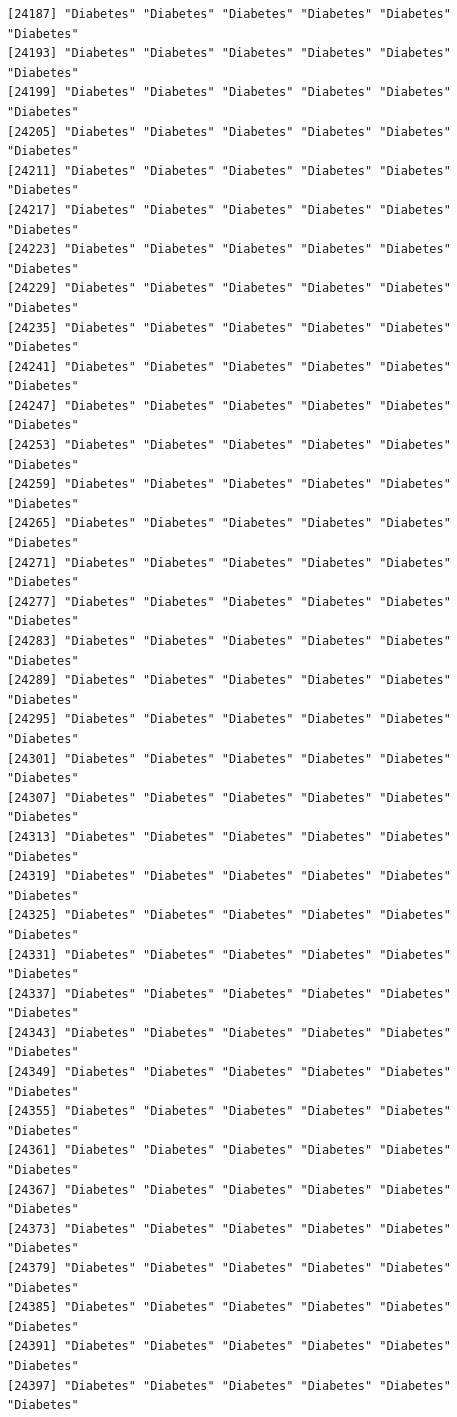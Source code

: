 \documentclass[
  letterpaper,
  DIV=11,
  numbers=noendperiod]{scrartcl}
\begin{document}
\begin{verbatim}
[24187] "Diabetes" "Diabetes" "Diabetes" "Diabetes" "Diabetes" "Diabetes"
[24193] "Diabetes" "Diabetes" "Diabetes" "Diabetes" "Diabetes" "Diabetes"
[24199] "Diabetes" "Diabetes" "Diabetes" "Diabetes" "Diabetes" "Diabetes"
[24205] "Diabetes" "Diabetes" "Diabetes" "Diabetes" "Diabetes" "Diabetes"
[24211] "Diabetes" "Diabetes" "Diabetes" "Diabetes" "Diabetes" "Diabetes"
[24217] "Diabetes" "Diabetes" "Diabetes" "Diabetes" "Diabetes" "Diabetes"
[24223] "Diabetes" "Diabetes" "Diabetes" "Diabetes" "Diabetes" "Diabetes"
[24229] "Diabetes" "Diabetes" "Diabetes" "Diabetes" "Diabetes" "Diabetes"
[24235] "Diabetes" "Diabetes" "Diabetes" "Diabetes" "Diabetes" "Diabetes"
[24241] "Diabetes" "Diabetes" "Diabetes" "Diabetes" "Diabetes" "Diabetes"
[24247] "Diabetes" "Diabetes" "Diabetes" "Diabetes" "Diabetes" "Diabetes"
[24253] "Diabetes" "Diabetes" "Diabetes" "Diabetes" "Diabetes" "Diabetes"
[24259] "Diabetes" "Diabetes" "Diabetes" "Diabetes" "Diabetes" "Diabetes"
[24265] "Diabetes" "Diabetes" "Diabetes" "Diabetes" "Diabetes" "Diabetes"
[24271] "Diabetes" "Diabetes" "Diabetes" "Diabetes" "Diabetes" "Diabetes"
[24277] "Diabetes" "Diabetes" "Diabetes" "Diabetes" "Diabetes" "Diabetes"
[24283] "Diabetes" "Diabetes" "Diabetes" "Diabetes" "Diabetes" "Diabetes"
[24289] "Diabetes" "Diabetes" "Diabetes" "Diabetes" "Diabetes" "Diabetes"
[24295] "Diabetes" "Diabetes" "Diabetes" "Diabetes" "Diabetes" "Diabetes"
[24301] "Diabetes" "Diabetes" "Diabetes" "Diabetes" "Diabetes" "Diabetes"
[24307] "Diabetes" "Diabetes" "Diabetes" "Diabetes" "Diabetes" "Diabetes"
[24313] "Diabetes" "Diabetes" "Diabetes" "Diabetes" "Diabetes" "Diabetes"
[24319] "Diabetes" "Diabetes" "Diabetes" "Diabetes" "Diabetes" "Diabetes"
[24325] "Diabetes" "Diabetes" "Diabetes" "Diabetes" "Diabetes" "Diabetes"
[24331] "Diabetes" "Diabetes" "Diabetes" "Diabetes" "Diabetes" "Diabetes"
[24337] "Diabetes" "Diabetes" "Diabetes" "Diabetes" "Diabetes" "Diabetes"
[24343] "Diabetes" "Diabetes" "Diabetes" "Diabetes" "Diabetes" "Diabetes"
[24349] "Diabetes" "Diabetes" "Diabetes" "Diabetes" "Diabetes" "Diabetes"
[24355] "Diabetes" "Diabetes" "Diabetes" "Diabetes" "Diabetes" "Diabetes"
[24361] "Diabetes" "Diabetes" "Diabetes" "Diabetes" "Diabetes" "Diabetes"
[24367] "Diabetes" "Diabetes" "Diabetes" "Diabetes" "Diabetes" "Diabetes"
[24373] "Diabetes" "Diabetes" "Diabetes" "Diabetes" "Diabetes" "Diabetes"
[24379] "Diabetes" "Diabetes" "Diabetes" "Diabetes" "Diabetes" "Diabetes"
[24385] "Diabetes" "Diabetes" "Diabetes" "Diabetes" "Diabetes" "Diabetes"
[24391] "Diabetes" "Diabetes" "Diabetes" "Diabetes" "Diabetes" "Diabetes"
[24397] "Diabetes" "Diabetes" "Diabetes" "Diabetes" "Diabetes" "Diabetes"

\end{verbatim}
\end{document}
